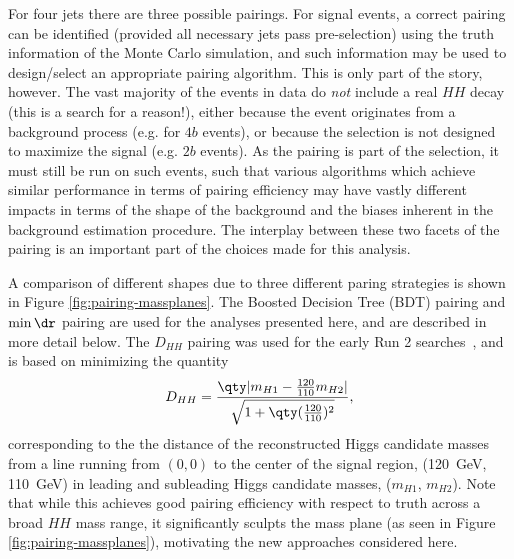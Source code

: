 For four jets there are three possible pairings. For signal events, a correct pairing can be identified
(provided all necessary jets pass pre-selection) using the truth information of the Monte Carlo simulation, 
and such information may be used to design/select an appropriate pairing algorithm. This is only part of 
the story, however. The vast majority of the events in data do \emph{not} include a real $HH$ decay (this is 
a search for a reason!), either because the event originates from a background process (e.g. for $4b$ events), or 
because the selection is not designed to maximize the signal (e.g. $2b$ events). As the pairing is 
part of the selection, it must still be run on such events, such that various algorithms which achieve similar
performance in terms of pairing efficiency may have vastly different impacts in terms of the shape of the background
and the biases inherent in the background estimation procedure. The interplay between these two facets of the 
pairing is an important part of the choices made for this analysis.

A comparison of different shapes due to three different paring strategies is shown in
Figure \ref{fig:pairing-massplanes}. The Boosted Decision Tree (BDT) pairing and $\min{\dr}$ pairing 
are used for the analyses presented here, and are described in more detail below. The $D_{HH}$ pairing 
was used for the early Run 2 searches~\cite{EXOT-2016-31}, and is based on minimizing the quantity 
\begin{equation}
D_{HH} = \frac{\qty|m_{H1} - \frac{120}{110}m_{H2}|}{\sqrt{1+\qty(\frac{120}{110})^2}},
\end{equation}
corresponding to the the distance of the reconstructed Higgs candidate masses from a line 
running from $(0, 0)$ to the center of the signal region, (\SI{120}{\GeV}, \SI{110}{\GeV}) in 
leading and subleading Higgs candidate masses, ($m_{H1}$, $m_{H2}$). Note that while 
this achieves good pairing efficiency with respect to truth across a broad $HH$ mass range, it significantly 
sculpts the mass plane (as seen in Figure \ref{fig:pairing-massplanes}), motivating the new 
approaches considered here.


